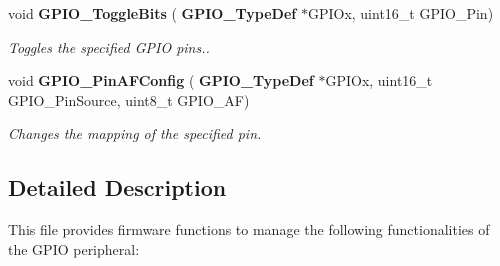 \begin{DoxyCompactItemize}
void \textbf{ G\+P\+I\+O\+\_\+\+Toggle\+Bits} (\textbf{ G\+P\+I\+O\+\_\+\+Type\+Def} $\ast$G\+P\+I\+Ox, uint16\+\_\+t G\+P\+I\+O\+\_\+\+Pin)
\begin{DoxyCompactList}\small\item\em Toggles the specified G\+P\+IO pins.. \end{DoxyCompactList}\item 
void \textbf{ G\+P\+I\+O\+\_\+\+Pin\+A\+F\+Config} (\textbf{ G\+P\+I\+O\+\_\+\+Type\+Def} $\ast$G\+P\+I\+Ox, uint16\+\_\+t G\+P\+I\+O\+\_\+\+Pin\+Source, uint8\+\_\+t G\+P\+I\+O\+\_\+\+AF)
\begin{DoxyCompactList}\small\item\em Changes the mapping of the specified pin. \end{DoxyCompactList}\end{DoxyCompactItemize}


\subsection{Detailed Description}
This file provides firmware functions to manage the following functionalities of the G\+P\+IO peripheral\+: 

